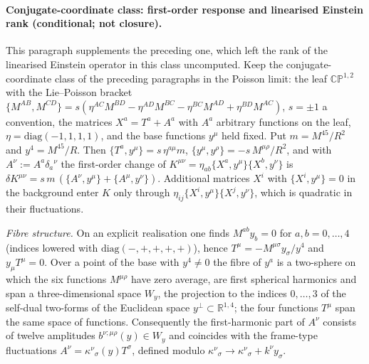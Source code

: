 \paragraph{Conjugate-coordinate class: first-order response and linearised Einstein rank (conditional; not closure).} \label{detail:sec-F-paragraphconjugatecoordinatecl-30}

This paragraph supplements the preceding one, which left the rank of the linearised Einstein operator in this class uncomputed. Keep the conjugate-coordinate class of the preceding paragraphs in the Poisson limit: the leaf \(\mathbb{CP}^{1,2}\) with the Lie--Poisson bracket \(\{M^{AB},M^{CD}\}=s(\eta^{AC}M^{BD}-\eta^{AD}M^{BC}-\eta^{BC}M^{AD}+\eta^{BD}M^{AC})\), \(s=\pm1\) a convention, the matrices \(X^a=T^a+A^a\) with \(A^a\) arbitrary functions on the leaf, \(\eta=\mathrm{diag}(-1,1,1,1)\), and the base functions \(y^\mu\) held fixed. Put \(m=M^{45}/R^2\) and \(y^4=M^{45}/R\). Then \(\{T^a,y^\mu\}=s\,\eta^{a\mu}m\), \(\{y^\mu,y^\rho\}=-s\,M^{\mu\rho}/R^2\), and with \(A^\nu:=A^a\delta_a{}^{\nu}\) the first-order change of \(K^{\mu\nu}=\eta_{ab}\{X^a,y^\mu\}\{X^b,y^\nu\}\) is \(\delta K^{\mu\nu}=s\,m\,(\{A^\nu,y^\mu\}+\{A^\mu,y^\nu\})\). Additional matrices \(X^i\) with \(\{X^i,y^\mu\}=0\) in the background enter \(K\) only through \(\eta_{ij}\{X^i,y^\mu\}\{X^j,y^\nu\}\), which is quadratic in their fluctuations.



\emph{Fibre structure.} On an explicit realisation one finds \(M^{ab}y_b=0\) for \(a,b=0,\dots,4\) (indices lowered with \(\mathrm{diag}(-,+,+,+,+)\)), hence \(T^\mu=-M^{\mu\sigma}y_\sigma/y^4\) and \(y_\mu T^\mu=0\). Over a point of the base with \(y^4\neq0\) the fibre of \(y^a\) is a two-sphere on which the six functions \(M^{\mu\rho}\) have zero average, are first spherical harmonics and span a three-dimensional space \(W_y\), the projection to the indices \(0,\dots,3\) of the self-dual two-forms of the Euclidean space \(y^\perp\subset\mathbb R^{1,4}\); the four functions \(T^\mu\) span the same space of functions. Consequently the first-harmonic part of \(A^\nu\) consists of twelve amplitudes \(b^{\nu;\mu\rho}(y)\in W_y\) and coincides with the frame-type fluctuations \(A^\nu=\kappa^\nu{}_\sigma(y)T^\sigma\), defined modulo \(\kappa^\nu{}_\sigma\to\kappa^\nu{}_\sigma+k^\nu y_\sigma\).




